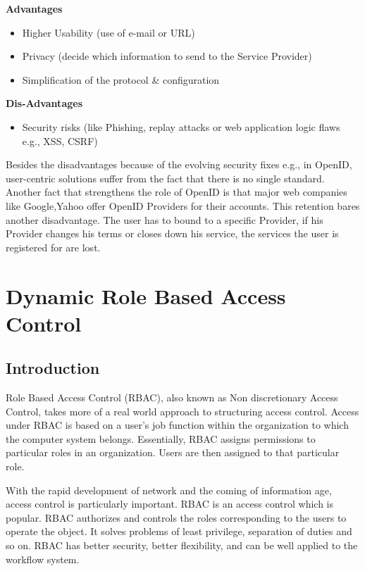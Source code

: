\documentclass[12pt]{report}
\begin{document}
	\textbf{Advantages}
	\begin{itemize}
	\item Higher Usability (use of e-mail or URL)
	\item Privacy (decide which information to send to the Service Provider)
	\item Simplification of the protocol \& configuration
	\end{itemize}
	
	\textbf{Dis-Advantages}
	\begin{itemize}
	\item Security risks (like Phishing, replay attacks or web application logic flaws e.g., XSS, CSRF)
	\end{itemize}
	Besides the disadvantages because of the evolving security fixes e.g., in OpenID, user-centric solutions suffer from the fact that there is no
	single standard. Another fact that strengthens the role of OpenID is that major web companies like Google,Yahoo offer OpenID Providers for their accounts. This retention bares another disadvantage. The user has to bound to a specific Provider, if his Provider changes his terms or closes down his service, the services the user is registered for are lost.

\newpage
\section{Dynamic Role Based Access Control}

\subsection{Introduction}
	\hspace{6mm}Role Based Access Control (RBAC), also known as Non discretionary Access Control, takes more of a real world approach to structuring access control. Access under RBAC is based on a user's job function within the organization to which the computer system belongs. Essentially, RBAC assigns permissions to particular roles in an organization. Users are then assigned to that particular role.\newline
		
With the rapid development of network and the coming of information age, access control is particularly important. RBAC is an access control which is popular. RBAC authorizes and controls the roles corresponding to the users to operate the object. It solves problems of least privilege, separation of duties and so on. RBAC has better security, better flexibility, and can be well applied to the workflow system.\newline
\end{document}

